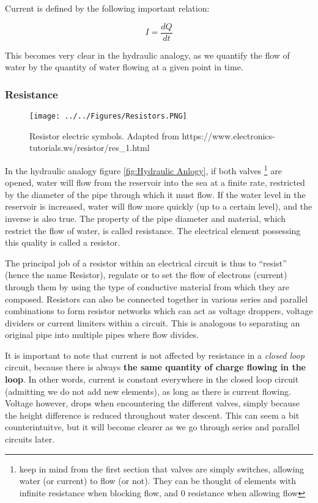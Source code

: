 Current is defined by the following important relation: 

\begin{equation}
    I = \frac{dQ}{dt}
\end{equation}

This becomes very clear in the hydraulic analogy, as we quantify the flow of water by the quantity of water flowing at a given point in time. 

\subsubsection{Resistance}

\begin{figure}[H]
    \centering
    \texttt{[image: ../../Figures/Resistors.PNG]}
    \caption{Resistor electric symbols. Adapted from https://www.electronics-tutorials.ws/resistor/res\_1.html}
    \label{fig:Resistors}
\end{figure}

In the hydraulic analogy figure \ref{fig:Hydraulic Anlogy}, if both valves \footnote{keep in mind from the first section that valves are simply switches, allowing water (or current) to flow (or not). They can be thought of elements with infinite resistance when blocking flow, and 0 resistance when allowing flow} are opened, water will flow from the reservoir into the sea at a finite rate, restricted by the diameter of the pipe through which it must flow. If the water level in the reservoir is increased, water will flow more quickly (up to a certain level), and the inverse is also true. The property of the pipe diameter and material, which restrict the flow of water, is called resistance. The electrical element possessing this quality is called a resistor. 

The principal job of a resistor within an electrical circuit is thus to “resist” (hence the name Resistor), regulate or to set the flow of electrons (current) through them by using the type of conductive material from which they are composed. Resistors can also be connected together in various series and parallel combinations to form resistor networks which can act as voltage droppers, voltage dividers or current limiters within a circuit. This is analogous to separating an original pipe into multiple pipes where flow divides.  

It is important to note that current is not affected by resistance in a \textit{closed loop} circuit, because there is always \textbf{the same quantity of charge flowing in the loop}. In other words, current is constant everywhere in the closed loop circuit (admitting we do not add new elements), as long as there is current flowing.  Voltage however, drops when encountering the different valves, simply because the height difference is reduced throughout water descent. This can seem a bit counterintuitve, but it will become clearer as we go through series and parallel circuits later.  


